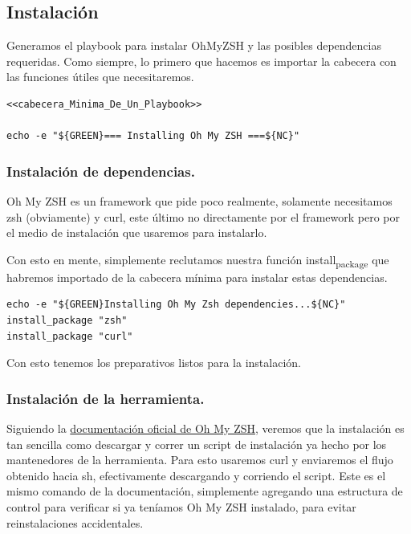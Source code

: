\documentclass[11pt]{article}
\begin{document}
\subsection{Instalación}
\label{sec:org03e4e16}

Generamos el playbook para instalar OhMyZSH y las posibles dependencias requeridas. Como siempre, lo primero que hacemos es importar la cabecera con las funciones útiles que necesitaremos.

\begin{verbatim}
<<cabecera_Minima_De_Un_Playbook>>

echo -e "${GREEN}=== Installing Oh My ZSH ===${NC}"

\end{verbatim}
\subsubsection{Instalación de dependencias.}
\label{sec:org176c532}

Oh My ZSH es un framework que pide poco realmente, solamente necesitamos zsh (obviamente) y curl, este último no directamente por el framework pero por el medio de instalación que usaremos para instalarlo.

Con esto en mente, simplemente reclutamos nuestra función install\textsubscript{package} que habremos importado de la cabecera mínima para instalar estas dependencias.

\begin{verbatim}
echo -e "${GREEN}Installing Oh My Zsh dependencies...${NC}"
install_package "zsh"
install_package "curl"

\end{verbatim}

Con esto tenemos los preparativos listos para la instalación.
\subsubsection{Instalación de la herramienta.}
\label{sec:org0b436db}

Siguiendo la \href{https://github.com/ohmyzsh/ohmyzsh/wiki}{documentación oficial de Oh My ZSH}, veremos que la instalación es tan sencilla como descargar y correr un script de instalación ya hecho por los mantenedores de la herramienta. Para esto usaremos curl y enviaremos el flujo obtenido hacia sh, efectivamente descargando y corriendo el script. Este es el mismo comando de la documentación, simplemente agregando una estructura de control para verificar si ya teníamos Oh My ZSH instalado, para evitar reinstalaciones accidentales.
\end{document}

